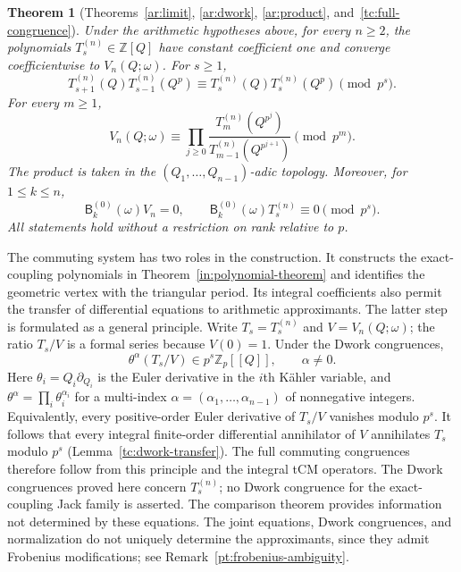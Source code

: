 \documentclass[11pt]{amsart}
\newtheorem{theorem}{Theorem}[section]
\theoremstyle{definition}
\theoremstyle{remark}
\numberwithin{equation}{section}
\newcommand{\Z}{\mathbb Z}
\begin{document}
\begin{theorem}[Theorems~\ref{ar:limit}, \ref{ar:dwork},
\ref{ar:product}, and~\ref{tc:full-congruence}]
\label{in:arithmetic-theorem}\label{in:product-theorem}
\label{in:energy-theorem}
Under the arithmetic hypotheses above, for every $n\geq2$,
the polynomials $T_s^{(n)}\in\Z[Q]$
have constant coefficient one and converge coefficientwise to
$V_n(Q;\omega)$. For $s\geq1$,
\begin{equation}\label{in:dwork}
 T_{s+1}^{(n)}(Q)T_{s-1}^{(n)}(Q^p)
 \equiv T_s^{(n)}(Q)T_s^{(n)}(Q^p)\pmod{p^s}.
\end{equation}
For every $m\geq1$,
\begin{equation}\label{in:product}
 V_n(Q;\omega)\equiv
 \prod_{j\geq0}
 \frac{T_m^{(n)}(Q^{p^j})}{T_{m-1}^{(n)}(Q^{p^{j+1}})}
 \pmod{p^m}.
\end{equation}
The product is taken in the $(Q_1,\ldots,Q_{n-1})$-adic topology.
Moreover, for $1\leq k\leq n$,
\begin{equation}\label{in:joint-congruences}
 \mathsf B_k^{(0)}(\omega)V_n=0,\qquad
 \mathsf B_k^{(0)}(\omega)T_s^{(n)}\equiv0\pmod{p^s}.
\end{equation}
All statements hold without a restriction on rank relative to $p$.
\end{theorem}

The commuting system has two roles in the construction. It
constructs the exact-coupling polynomials in
Theorem~\ref{in:polynomial-theorem} and identifies the geometric
vertex with the triangular period. Its integral coefficients
also permit the transfer of differential equations to arithmetic
approximants. The latter step is formulated as a general principle.
Write $T_s=T_s^{(n)}$ and $V=V_n(Q;\omega)$; the ratio
$T_s/V$ is a formal series because $V(0)=1$.
Under the Dwork congruences,
\[
 \theta^\alpha(T_s/V)\in p^s\Z_p[[Q]],\qquad \alpha\ne0.
\]
Here $\theta_i=Q_i\partial_{Q_i}$ is the Euler derivative in
the $i$th K\"ahler variable, and
$\theta^\alpha=\prod_i\theta_i^{\alpha_i}$ for a multi-index
$\alpha=(\alpha_1,\ldots,\alpha_{n-1})$ of nonnegative integers.
Equivalently, every positive-order Euler derivative of $T_s/V$
vanishes modulo $p^s$.
It follows that every integral finite-order differential
annihilator of $V$ annihilates $T_s$ modulo $p^s$
(Lemma~\ref{tc:dwork-transfer}). The full commuting congruences
therefore follow from this principle and the integral tCM
operators.
The Dwork congruences proved here concern $T_s^{(n)}$; no
Dwork congruence for the exact-coupling Jack family is asserted.
The comparison theorem provides information not determined by
these equations. The joint equations, Dwork congruences, and
normalization do not uniquely determine the approximants, since
they admit Frobenius modifications; see
Remark~\ref{pt:frobenius-ambiguity}.
\end{document}
